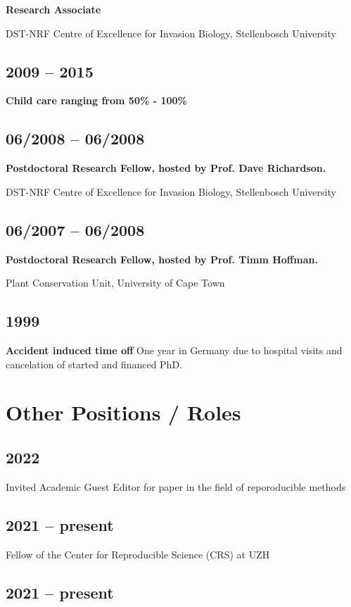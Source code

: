 \documentclass[a4paper]{article}
\begin{document}
\textbf{Research Associate}

DST-NRF Centre of Excellence for Invasion Biology, Stellenbosch University

\subsection{2009 -- 2015 }

\textbf{Child care ranging from 50\% - 100\%}


\subsection{06/2008 -- 06/2008}

\textbf{Postdoctoral Research Fellow, hosted by Prof. Dave Richardson.}

DST-NRF Centre of Excellence for Invasion Biology, Stellenbosch University

\subsection{06/2007 -- 06/2008}

\textbf{Postdoctoral Research Fellow, hosted by Prof. Timm Hoffman.} 

Plant Conservation Unit, University of Cape Town

\subsection{1999}
\textbf{Accident induced time off}
One year in Germany due to hospital visits and cancelation of started and financed PhD.


\section{Other Positions / Roles}

\subsection{2022}
Invited Academic Guest Editor for paper in the field of reporoducible methods


\subsection{2021 -- present}
Fellow of the Center for Reproducible Science (CRS) at UZH

\subsection{2021 -- present}
\end{document}
